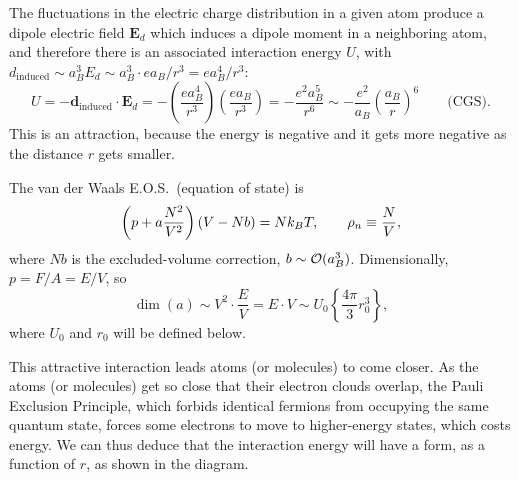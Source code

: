 The fluctuations in the electric charge distribution in a given atom produce a dipole
electric field $\mathbf{E}_d$ which induces a dipole moment in a neighboring atom, and
therefore there is an associated interaction energy $U$, with
$d_{\text{induced}}\sim a_B^3E_d\sim a_B^3\cdot ea_B/r^3 = ea_B^4/r^3$:
\begin{equation}
  U = -\mathbf{d}_{\text{induced}}\cdot\mathbf{E}_d
  = -\left(\frac{ea_B^4}{r^3}\right)\left(\frac{ea_B}{r^3}\right)
  = -\frac{e^2a_B^5}{r^6}\sim-\frac{e^2}{a_B}\left(\frac{a_B}{r}\right)^6
  \qquad\text{(CGS)}.
\end{equation}
This is an attraction, because the energy is negative and it gets more negative as the
distance $r$ gets smaller.

The van der Waals E.O.S.\ (equation of state) is
\begin{equation}
  \left(p + a\frac{N^2}{V^2}\right)(V-Nb) = Nk_{B} T,\qquad \rho_n\equiv\frac{N}{V},
\end{equation}
where $Nb$ is the excluded-volume correction, $b\sim\mathcal{O}(a_B^3)$. Dimensionally,
$p = F/A = E/V$, so
\begin{equation}
  \dim(a)\sim V^2\cdot\frac{E}{V} = E\cdot V\sim U_0\left\{\frac{4\pi}{3}r_0^3\right\},
\end{equation}
where $U_0$ and $r_0$ will be defined below.

This attractive interaction leads atoms (or molecules) to come closer. As the atoms (or
molecules) get so close that their electron clouds overlap, the Pauli Exclusion
Principle, which forbids identical fermions from occupying the same quantum state,
forces some electrons to move to higher-energy states, which costs energy. We can thus
deduce that the interaction energy will have a form, as a function of $r$, as shown in
the diagram.

\begin{diagram}
\label{fig:lj}
\end{diagram}

